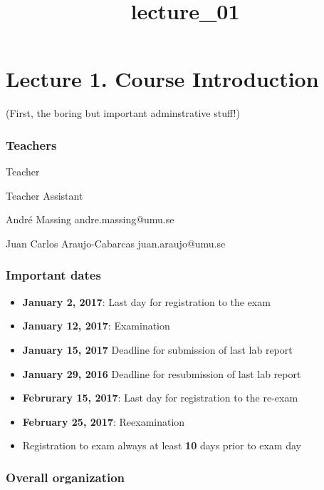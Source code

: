 \documentclass[11pt]{article}
\title{lecture\_01}
\providecommand{\tightlist}{%
      \setlength{\itemsep}{0pt}\setlength{\parskip}{0pt}}
\begin{document}
    
    
    \maketitle
    
    

    
    \section{Lecture 1. Course
Introduction}\label{lecture-1.-course-introduction}

(First, the boring but important adminstrative stuff!)

\subsubsection{Teachers}\label{teachers}

 Teacher

 Teacher Assistant

André Massing andre.massing@umu.se

Juan Carlos Araujo-Cabarcas juan.araujo@umu.se

    \subsubsection{Important dates}\label{important-dates}

\begin{itemize}
\tightlist
\item
  \textbf{January 2, 2017}: Last day for registration to the exam
\item
  \textbf{January 12, 2017}: Examination
\item
  \textbf{January 15, 2017} Deadline for submission of last lab report
\item
  \textbf{January 29, 2016} Deadline for resubmission of last lab report
\item
  \textbf{Februrary 15, 2017}: Last day for registration to the re-exam
\item
  \textbf{February 25, 2017}: Reexamination
\item
  Registration to exam always at least \textbf{10} days prior to exam
  day
\end{itemize}

    \subsubsection{Overall organization}\label{overall-organization}
\end{document}

